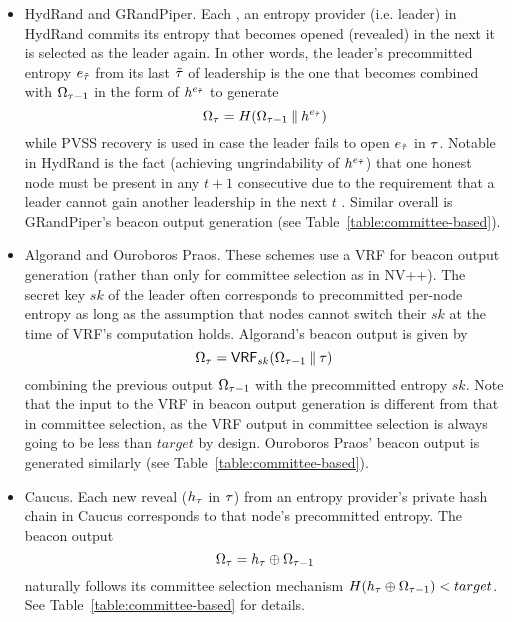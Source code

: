 \begin{itemize}
\item HydRand and GRandPiper. Each \epoch, an entropy provider (i.e. \epoch leader) in HydRand commits its entropy that becomes opened (revealed) in the next \epoch it is selected as the leader again. In other words, the \epoch leader's precommitted entropy $e_{\tilde{\tau}}$ from its last \epoch $\tilde{\tau}$ of leadership is the one that becomes combined with $\Omega_{\tau - 1}$ in the form of $h^{e_{\tilde{\tau}}}$ to generate
\[
\Omega_\tau = H(\Omega_{\tau - 1} \mathbin\Vert h^{e_{\tilde{\tau}}})
\]
while PVSS recovery is used in case the leader fails to open $e_{\tilde{\tau}}$ in \epoch $\tau$. Notable in HydRand is the fact (achieving ungrindability of $h^{e_{\tilde{\tau}}}$) that one honest node must be present in any $t + 1$ consecutive \epochs due to the requirement that a leader cannot gain another leadership in the next $t$ \epochs. Similar overall is GRandPiper's beacon output generation (see Table~\ref{table:committee-based}).
\item Algorand and Ouroboros Praos. These schemes use a VRF for beacon output generation (rather than only for committee selection as in NV++). The secret key $sk$ of the \epoch leader often corresponds to precommitted per-node entropy as long as the assumption that nodes cannot switch their $sk$ at the time of VRF's computation holds. Algorand's beacon output is given by
\[
\Omega_\tau = \textsf{VRF}_{sk}(\Omega_{\tau - 1} \mathbin\Vert \tau)
\]
combining the previous output $\Omega_{\tau - 1}$ with the precommitted entropy $sk$. Note that the input to the VRF in beacon output generation is different from that in committee selection, as the VRF output in committee selection is always going to be less than $target$ by design. Ouroboros Praos' beacon output is generated similarly (see Table~\ref{table:committee-based}).
\item Caucus. Each new reveal ($h_\tau$ in \epoch $\tau$) from an entropy provider's private hash chain in Caucus corresponds to that node's precommitted entropy. The beacon output
\[
\Omega_\tau = h_\tau \oplus \Omega_{\tau - 1}
\]
naturally follows its committee selection mechanism $H(h_\tau \oplus \Omega_{\tau - 1}) < target$. See Table~\ref{table:committee-based} for details.
\end{itemize}
